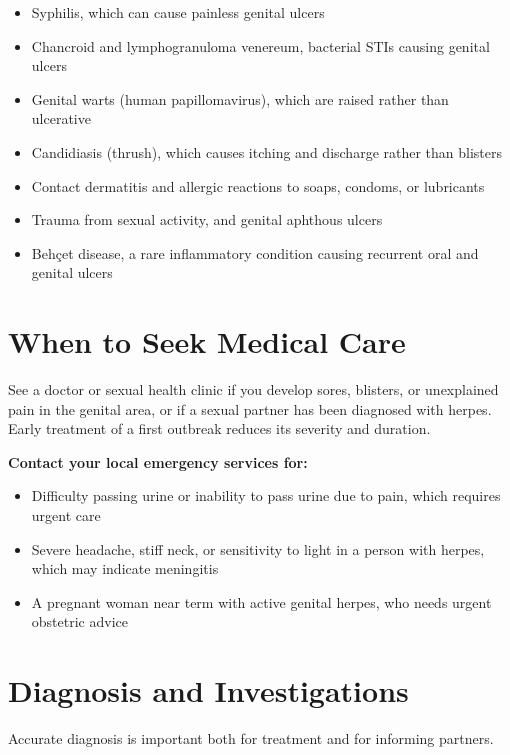 \begin{itemize}
    \item Syphilis, which can cause painless genital ulcers
    \item Chancroid and lymphogranuloma venereum, bacterial STIs causing genital ulcers
    \item Genital warts (human papillomavirus), which are raised rather than ulcerative
    \item Candidiasis (thrush), which causes itching and discharge rather than blisters
    \item Contact dermatitis and allergic reactions to soaps, condoms, or lubricants
    \item Trauma from sexual activity, and genital aphthous ulcers
    \item Behçet disease, a rare inflammatory condition causing recurrent oral and genital ulcers
\end{itemize}

\section*{When to Seek Medical Care}
See a doctor or sexual health clinic if you develop sores, blisters, or unexplained pain in the genital area, or if a sexual partner has been diagnosed with herpes. Early treatment of a first outbreak reduces its severity and duration.

\textbf{Contact your local emergency services for:}
\begin{itemize}
    \item Difficulty passing urine or inability to pass urine due to pain, which requires urgent care
    \item Severe headache, stiff neck, or sensitivity to light in a person with herpes, which may indicate meningitis
    \item A pregnant woman near term with active genital herpes, who needs urgent obstetric advice
\end{itemize}

\section*{Diagnosis and Investigations}
Accurate diagnosis is important both for treatment and for informing partners.

